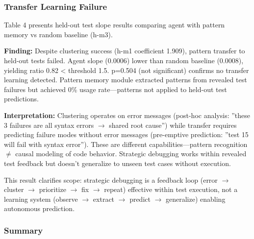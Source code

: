 \subsubsection{Transfer Learning Failure}

Table 4 presents held-out test slope results comparing agent with pattern memory vs random baseline (h-m3).

\begin{table}[htbp]
\centering
{}
\end{table}

\textbf{Finding:} Despite clustering success (h-m1 coefficient 1.909), pattern transfer to held-out tests failed. Agent slope (0.0006) lower than random baseline (0.0008), yielding ratio 0.82 < threshold 1.5. p=0.504 (not significant) confirms no transfer learning detected. Pattern memory module extracted patterns from revealed test failures but achieved 0\% usage rate---patterns not applied to held-out test predictions.

\textbf{Interpretation:} Clustering operates on error messages (post-hoc analysis: ''these 3 failures are all syntax errors $\rightarrow$ shared root cause'') while transfer requires predicting failure modes without error messages (pre-emptive prediction: ''test 15 will fail with syntax error''). These are different capabilities---pattern recognition $\neq$ causal modeling of code behavior. Strategic debugging works within revealed test feedback but doesn't generalize to unseen test cases without execution.

This result clarifies scope: strategic debugging is a feedback loop (error $\rightarrow$ cluster $\rightarrow$ prioritize $\rightarrow$ fix $\rightarrow$ repeat) effective within test execution, not a learning system (observe $\rightarrow$ extract $\rightarrow$ predict $\rightarrow$ generalize) enabling autonomous prediction.

\subsubsection{Summary}

